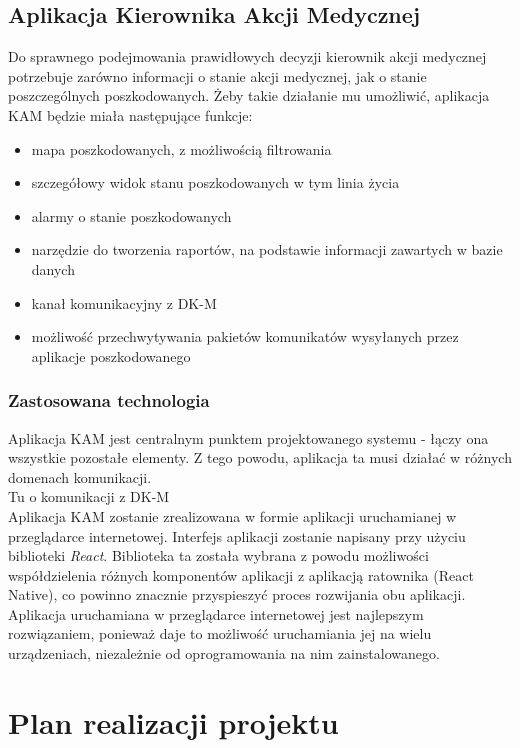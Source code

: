 \documentclass[11pt]{report}
\begin{document}
\subsection{Aplikacja Kierownika Akcji Medycznej}
Do sprawnego podejmowania prawidłowych decyzji kierownik akcji medycznej potrzebuje zarówno informacji o stanie akcji medycznej, jak o stanie poszczególnych poszkodowanych. Żeby takie działanie mu umożliwić, aplikacja KAM będzie miała następujące funkcje:
\begin{itemize}
    \item mapa poszkodowanych, z możliwością filtrowania
    \item szczegółowy widok stanu poszkodowanych w tym linia życia
    \item alarmy o stanie poszkodowanych
    \item narzędzie do tworzenia raportów, na podstawie informacji zawartych w bazie danych
    \item kanał komunikacyjny z DK-M
    \item możliwość przechwytywania pakietów komunikatów wysyłanych przez aplikacje poszkodowanego
\end{itemize}
\subsubsection{Zastosowana technologia}
Aplikacja KAM jest centralnym punktem projektowanego systemu - łączy ona wszystkie pozostałe elementy. Z tego powodu, aplikacja ta musi działać w różnych domenach komunikacji. \\

Tu o komunikacji z DK-M\\
Aplikacja KAM zostanie zrealizowana w formie aplikacji uruchamianej w przeglądarce internetowej. Interfejs aplikacji zostanie napisany przy użyciu biblioteki \textit{React}. Biblioteka ta została wybrana z powodu możliwości współdzielenia różnych komponentów aplikacji z aplikacją ratownika (React Native), co powinno znacznie przyspieszyć proces rozwijania obu aplikacji.
Aplikacja uruchamiana w przeglądarce internetowej jest najlepszym rozwiązaniem, ponieważ daje to możliwość uruchamiania jej na wielu urządzeniach, niezależnie od oprogramowania na nim zainstalowanego.
\newpage
\section{Plan realizacji projektu}
\end{document}
